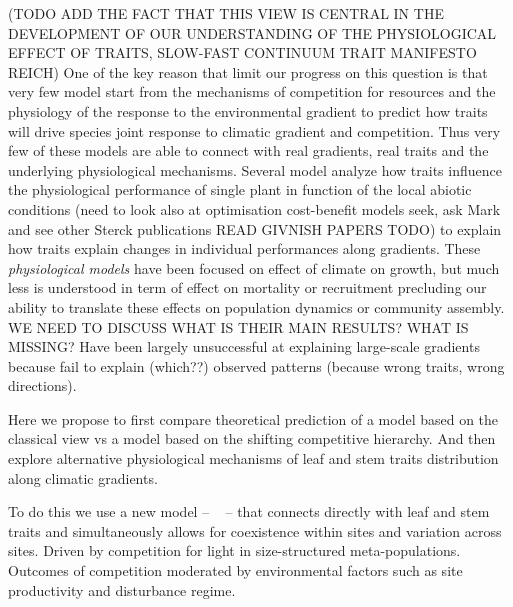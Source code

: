 \documentclass[a4paper,11pt]{article}
\begin{document}
(TODO ADD THE FACT THAT THIS VIEW IS CENTRAL IN THE DEVELOPMENT OF OUR UNDERSTANDING OF THE PHYSIOLOGICAL EFFECT OF TRAITS, SLOW-FAST CONTINUUM TRAIT MANIFESTO REICH)
One of the key reason that limit our progress on this question is that very few model start from the mechanisms of competition for resources and the physiology of the response to the environmental gradient to predict how traits will drive species joint response to climatic gradient and competition. Thus very few of these models are able to connect with real gradients,
real traits and the underlying physiological mechanisms. Several model
analyze how traits influence the physiological performance of single
plant in function of the local abiotic conditions \citep{Sterck-2011}
(need to look also at optimisation cost-benefit models seek, ask Mark
and see other Sterck publications READ GIVNISH PAPERS TODO) to explain how traits explain changes in individual performances along gradients. These \textit{physiological models} have been focused on effect of climate on growth, but much less is understood in term of effect on mortality or recruitment precluding our ability to translate these effects on population dynamics or community assembly.
WE NEED TO DISCUSS \citep{Sakschewski-2015,Scheiter-2013} WHAT IS THEIR MAIN RESULTS? WHAT IS MISSING?
Have been largely unsuccessful at explaining large-scale gradients because fail to explain (which??) observed patterns (because wrong traits, wrong directions).

Here we propose to first compare theoretical prediction of a model based on the classical view vs a model based on the shifting competitive hierarchy. And then explore alternative physiological mechanisms of leaf and stem traits distribution along climatic gradients.

To do this we use a new model -- \plant\ \citep{Falster-2016} -- that connects directly with leaf and stem traits and simultaneously allows for coexistence within sites and variation across sites.  Driven by competition for light in size-structured meta-populations. Outcomes of competition moderated by environmental factors such as site productivity and disturbance regime.
\end{document}
